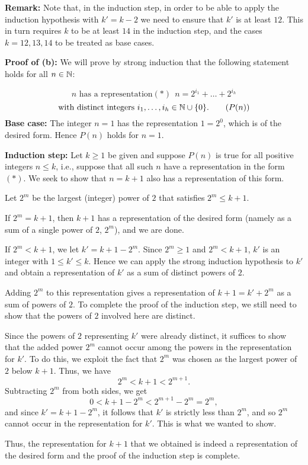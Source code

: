 \bigskip

\textbf{Remark:} Note that, in the induction step, in order to be able
to apply the induction hypothesis with $k'=k-2$ we need to ensure that 
$k'$ is at least $12$. This in turn requires $k$ 
to be at least $14$ in the induction step,
and the cases $k=12,13,14$ to be treated as base
cases.


\textbf{Proof of (b):}
We will prove by strong induction that the following statement  
holds for all $n\in\mathbb{N}$:

\[\text{$n$ has a representation}(*) ~~n=2^{i_1}+\dots + 2^{i_h} \]
\[ \text{with distinct integers $i_1,\dots,i_h\in\mathbb{N}\cup\{0\}$.}
\tag{$P(n)$}
\]
\textbf{Base case:} The integer $n=1$ has the representation $1=2^0$,
which is of the desired form. Hence $P(n)$ holds for $n=1$.


\textbf{Induction step:} 
Let $k\ge1$ be given and suppose $P(n)$ is true for all positive
integers $ n\le k$, i.e., suppose that all such $n$ have a
representation in the form $(*)$. We seek to show that $n=k+1$ also has a
representation of this form. 

Let $2^m$ be the largest (integer) power of $2$ that satisfies $2^m\le k+1$.

If $2^m=k+1$, then $k+1$ has a representation of the desired form
(namely as a sum of a single power of $2$, $2^m$), and we are done.

If $2^m<k+1$, we let $k'=k+1-2^m$.  Since $2^m\ge1$
and $2^m<k+1$, $k'$ is an integer with $1\le k'\le k$. 
Hence we can apply the strong induction hypothesis to $k'$ and obtain a
representation of $k'$ as a sum of distinct powers of $2$.

Adding $2^m$ to this representation gives a representation of $k+1=k'+2^m$
as a sum of powers of $2$. To complete the proof of the induction step,
we still need to show that the powers of $2$ involved here are distinct.

Since the powers of $2$ representing $k'$ were already distinct, it
suffices to show that the added power $2^m$ cannot occur among the
powers in the representation for $k'$. 
To do this, we exploit the fact that $2^m$ was chosen as the largest
power of $2$ below $k+1$. Thus, we have
\[
2^m< k+1 < 2^{m+1}.
\]
Subtracting $2^m$ from both sides, we get 
\[
0< k+1-2^m<2^{m+1}-2^m=2^m,
\]
and since $k'=k+1-2^m$, it follows that $k'$ is strictly less than
$2^m$, and so $2^m$ cannot occur in the representation for $k'$.
This is what we wanted to show.

Thus, the representation for $k+1$ that we obtained is indeed a
representation of the desired form and the proof of the 
induction step is complete.

